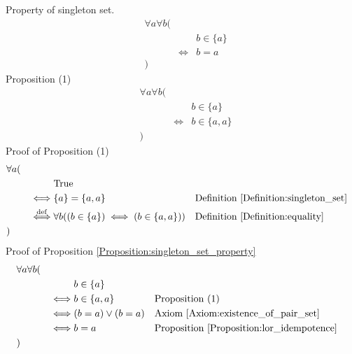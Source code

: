 \begin{prop}
\label{Proposition:singleton_set_property}
Property of singleton set.
\begin{align*}
& \forall a \forall b ( \\
& & & b \in \{ a \} \\
& & \iff & b = a \\
& )
\end{align*}
Proposition (1)
\begin{align*}
& \forall a \forall b ( \\
& & & b \in \{ a \} \\
& & \iff & b \in \{ a , a \} \\
& )
\end{align*}
Proof of Proposition (1)
\begin{align*}
& \forall a ( \\
& & & \text{True} \\
& & \iff & \{ a \} = \{ a , a \}
& & \text{Definition \ref{Definition:singleton_set}} \\
& & \overset{\operatorname{def}}{\iff} & \forall b ((b \in \{ a \}) \iff (b \in \{ a , a \}))
& & \text{Definition \ref{Definition:equality}} \\
& )
\end{align*}
Proof of Proposition \ref{Proposition:singleton_set_property}
\begin{align*}
& \forall a \forall b ( \\
& & & b \in \{ a \} \\
& & \iff & b \in \{ a , a \}
& & \text{Proposition (1)} \\
& & \iff & (b = a) \lor (b = a)
& & \text{Axiom \ref{Axiom:existence_of_pair_set}} \\
& & \iff & b = a
& & \text{Proposition \ref{Proposition:lor_idempotence}} \\
& )
\end{align*}
\end{prop}

